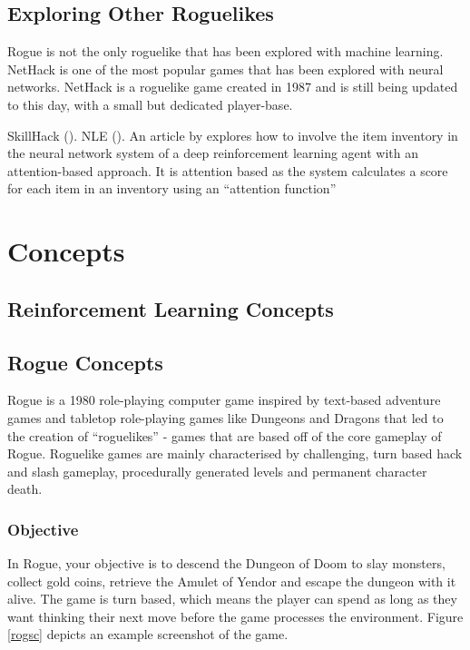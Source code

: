 \documentclass[11pt,a4paper]{article}
\begin{document}
    \subsection{Exploring Other Roguelikes}
    Rogue is not the only roguelike that has been explored with machine learning. NetHack is one of the most popular games that has been explored with neural networks. NetHack is a roguelike game created in 1987 and is still being updated to this day, with a small but dedicated player-base.

    SkillHack (\cite{matthews22}).
    NLE (\cite{kuttler20}).
    An article by \cite{izumiya21} explores how to involve the item inventory in the neural network system of a deep reinforcement learning agent with an attention-based approach. It is attention based as the system calculates a score for each item in an inventory using an ``attention function''

    \section{Concepts}
    \subsection{Reinforcement Learning Concepts}

    \subsection{Rogue Concepts}
    Rogue is a 1980 role-playing computer game inspired by text-based adventure games and tabletop role-playing games like Dungeons and Dragons that led to the creation of ``roguelikes'' - games that are based off of the core gameplay of Rogue. Roguelike games are mainly characterised by challenging, turn based hack and slash gameplay, procedurally generated levels and permanent character death.

    \subsubsection{Objective}
    In Rogue, your objective is to descend the Dungeon of Doom to slay monsters, collect gold coins, retrieve the Amulet of Yendor and escape the dungeon with it alive. The game is turn based, which means the player can spend as long as they want thinking their next move before the game processes the environment. Figure \ref{rogsc} depicts an example screenshot of the game.
\end{document}
